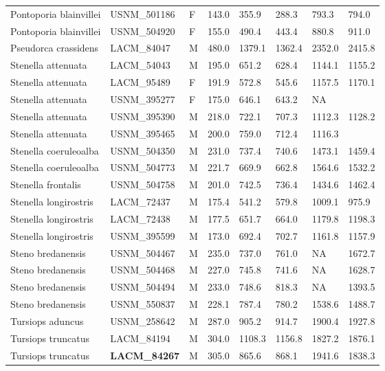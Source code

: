 \begin{longtable}{|p{1.95in}p{1.1in}p{.15in}p{.4in}p{.4in}p{.4in}p{.4in}p{.4in}|}
  Pontoporia blainvillei & USNM\_501186 & F & 143.0 & 355.9 & 288.3 & 793.3 & 794.0 \\ 
  Pontoporia blainvillei & USNM\_504920 & F & 155.0 & 490.4 & 443.4 & 880.8 & 911.0 \\ 
  Pseudorca crassidens & LACM\_84047 & M & 480.0 & 1379.1 & 1362.4 & 2352.0 & 2415.8 \\ 
  Stenella attenuata & LACM\_54043 & M & 195.0 & 651.2 & 628.4 & 1144.1 & 1155.2 \\ 
  Stenella attenuata & LACM\_95489 & F & 191.9 & 572.8 & 545.6 & 1157.5 & 1170.1 \\ 
  Stenella attenuata & USNM\_395277 & F & 175.0 & 646.1 & 643.2 & NA &  \\ 
  Stenella attenuata & USNM\_395390 & M & 218.0 & 722.1 & 707.3 & 1112.3 & 1128.2 \\ 
  Stenella attenuata & USNM\_395465 & M & 200.0 & 759.0 & 712.4 & 1116.3 &  \\ 
  Stenella coeruleoalba & USNM\_504350 & M & 231.0 & 737.4 & 740.6 & 1473.1 & 1459.4 \\ 
  Stenella coeruleoalba & USNM\_504773 & M & 221.7 & 669.9 & 662.8 & 1564.6 & 1532.2 \\ 
  Stenella frontalis & USNM\_504758 & M & 201.0 & 742.5 & 736.4 & 1434.6 & 1462.4 \\ 
  Stenella longirostris & LACM\_72437 & M & 175.4 & 541.2 & 579.8 & 1009.1 & 975.9 \\ 
  Stenella longirostris & LACM\_72438 & M & 177.5 & 651.7 & 664.0 & 1179.8 & 1198.3 \\ 
  Stenella longirostris & USNM\_395599 & M & 173.0 & 692.4 & 702.7 & 1161.8 & 1157.9 \\ 
  Steno bredanensis & USNM\_504467 & M & 235.0 & 737.0 & 761.0 & NA & 1672.7 \\ 
  Steno bredanensis & USNM\_504468 & M & 227.0 & 745.8 & 741.6 & NA & 1628.7 \\ 
  Steno bredanensis & USNM\_504494 & M & 233.0 & 748.6 & 818.3 & NA & 1393.5 \\ 
  Steno bredanensis & USNM\_550837 & M & 228.1 & 787.4 & 780.2 & 1538.6 & 1488.7 \\ 
  Tursiops aduncus & USNM\_258642 & M & 287.0 & 905.2 & 914.7 & 1900.4 & 1927.8 \\ 
  Tursiops truncatus & LACM\_84194 & M & 304.0 & 1108.3 & 1156.8 & 1827.2 & 1876.1 \\ 
  Tursiops truncatus & \textbf{ LACM\_84267 } & M & 305.0 & 865.6 & 868.1 & 1941.6 & 1838.3 \\ 

\end{longtable}
